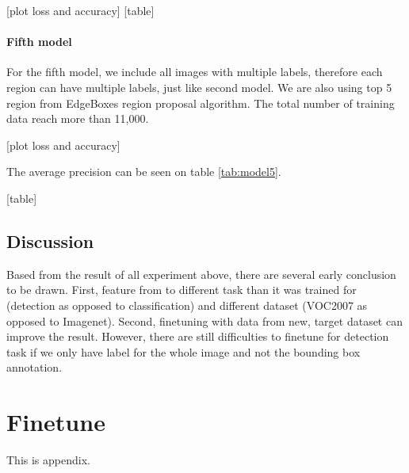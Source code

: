 \documentclass[a4paper,11pt]{kth-mag}
\begin{document}
[plot loss and accuracy]
[table]

\subsubsection{Fifth model}
For the fifth model, we include all images with multiple labels, therefore each region can have multiple labels, just like second model. We are also using top 5 region from EdgeBoxes region proposal algorithm. The total number of training data reach more than 11,000.

[plot loss and accuracy]

The average precision can be seen on table \ref{tab:model5}.

[table]

\section{Discussion}
Based from the result of all experiment above, there are several early conclusion to be drawn. First, feature from to different task than it was trained for (detection as opposed to classification) and different dataset (VOC2007 as opposed to Imagenet). Second, finetuning with data from new, target dataset can improve the result. However, there are still difficulties to finetune for detection task if we only have label for the whole image and not the bounding box annotation.




\appendix
\addappheadtotoc
\chapter{Finetune}\label{appA}

This is appendix.
\end{document}
